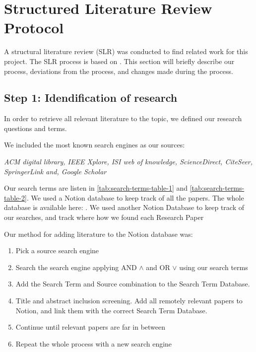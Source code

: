 
\section{Structured Literature Review Protocol}

A structural literature review (SLR) was conducted to find related work for this project.
The SLR process is based on \cite{AndersKofod-Petersen2018}.
This section will briefly describe our process, deviations from the process,
and changes made during the process.

\subsection{Step 1: Idendification of research}
In order to retrieve all relevant literature to the topic, we defined our
research questions and terms.

We included the most known search engines as our sources:

\textit{
ACM digital library,
IEEE Xplore,
ISI web of knowledge,
ScienceDirect,
CiteSeer,
SpringerLink and,
Google Scholar
}

Our search terms are listen in \autoref{tab:search-terms-table-1} and \autoref{tab:search-terms-table-2}.
We used a Notion database to keep track of all the papers. The whole database is available here: \cite{slrdatabase}.
We used another Notion Database to keep track of our searches, and track where how we found each Research Paper
\cite{searchtermtable}

Our method for adding literature to the Notion database was:
\begin{enumerate}
    \item Pick a source search engine
    \item Search the search engine applying AND $\wedge$ and OR $\vee$ using our search terms
    \item Add the Search Term and Source combination to the Search Term Database.
    \item Title and abstract inclusion screening. Add all remotely relevant papers to Notion, and link them with the correct Search Term Database.
    \item Continue until relevant papers are far in between
    \item Repeat the whole process with a new search engine
\end{enumerate}

